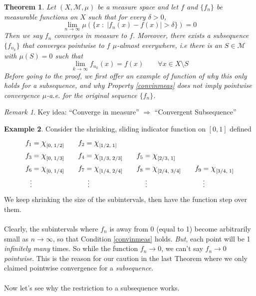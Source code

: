 \documentclass[12pt]{article}
\theoremstyle{plain}
\newtheorem{thm}{Theorem}[subsection]
\theoremstyle{definition}
\newtheorem{ex}[thm]{Example}
\theoremstyle{remark}
\newtheorem*{rmk}{Remark}
\newcommand*{\Chi}{\mbox{\large$\chi$}} %
\begin{document}
\begin{thm}
Let $(X,\mathscr{M},\mu)$ be a measure space and let $f$ and $\{f_n\}$ be measurable functions on $X$ such that for every $\delta>0$, 
\begin{equation}
    \label{convinmeas}
    \lim_{n\rightarrow\infty} \mu\left(
    \{x \; : \; |f_n(x) - f(x)| > \delta\}\right)
    = 0
\end{equation}
Then we say $f_n$ converges \emph{in measure} to $f$. Moreover, there exists a subsequence $\{f_{n_k}\}$ that converges pointwise to $f$ $\mu$-almost everywhere, i.e there is an $S\in\mathscr{M}$ with $\mu(S)=0$ such that  
\[
    \lim_{k\rightarrow\infty} f_{n_k}(x) = f(x)
    \qquad \forall x \in X\setminus S
\]
Before going to the proof, we first offer an example of function of why this only holds for a \emph{subsequence}, and why Property \ref{convinmeas} does \emph{not} imply pointwise convergence $\mu$-a.e. for the original sequence $\{f_n\}$.
\end{thm}
\begin{rmk}
Key idea: ``Converge in measure'' $\Rightarrow$ ``Convergent Subsequence''
\end{rmk}
\begin{ex}
    Consider the shrinking, sliding indicator function on $[0,1]$ defined
\begin{align*}
    f_1 &= \Chi_{[0,\;1/2]} \qquad
    f_2 = \Chi_{[1/2,\;1]} \\
    f_3 &= \Chi_{[0,\;1/3]} \qquad
    f_4 = \Chi_{[1/3,\;2/3]} \qquad
    f_5 = \Chi_{[2/3,\;1]} \\
    f_6 &= \Chi_{[0,\;1/4]} \qquad
    f_7 = \Chi_{[1/4,\;2/4]} \qquad
    f_8 = \Chi_{[2/4,\;3/4]} \qquad
    f_9 = \Chi_{[3/4,\;1]} \\
    \vdots & 
    \qquad\qquad\qquad\qquad \vdots
    \qquad\qquad\qquad\qquad \vdots
    \qquad\qquad\qquad\qquad \vdots
\end{align*}
We keep shrinking the size of the subintervals, then have the function step over them.
\\
\\
Clearly, the subintervals where $f_n$ is away from 0 (equal to 1) become arbitrarily small as $n\rightarrow\infty$, so that Condition \ref{convinmeas} holds. \emph{But}, each point will be 1 \emph{infinitely many} times. So while the function $f_n\rightarrow 0$, we can't say $f_n\rightarrow 0$ \emph{pointwise}. This is the reason for our caution in the last Theorem where we only claimed pointwise convergence for a \emph{subsequence}.
\\
\\
Now let's see why the restriction to a subsequence works.
\end{ex}
\end{document}
